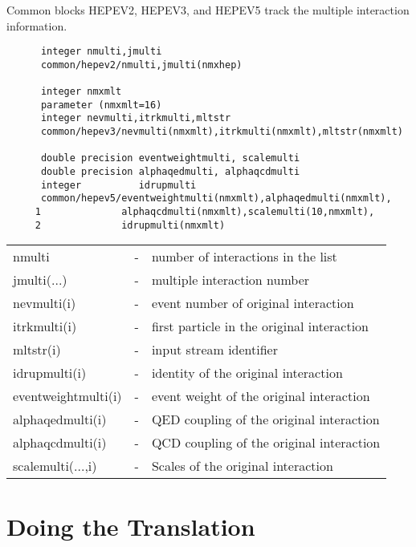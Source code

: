 \noindent Common blocks HEPEV2, HEPEV3, and HEPEV5 track the 
multiple interaction information.
\begin{verbatim}
      integer nmulti,jmulti
      common/hepev2/nmulti,jmulti(nmxhep)

      integer nmxmlt
      parameter (nmxmlt=16)
      integer nevmulti,itrkmulti,mltstr
      common/hepev3/nevmulti(nmxmlt),itrkmulti(nmxmlt),mltstr(nmxmlt)

      double precision eventweightmulti, scalemulti
      double precision alphaqedmulti, alphaqcdmulti
      integer          idrupmulti
      common/hepev5/eventweightmulti(nmxmlt),alphaqedmulti(nmxmlt),
     1              alphaqcdmulti(nmxmlt),scalemulti(10,nmxmlt),
     2              idrupmulti(nmxmlt)
\end{verbatim}
\begin{center}
\begin{tabular}{lcl}
  nmulti              &-& number of interactions in the list\\
  jmulti(...)         &-& multiple interaction number\\
  nevmulti(i)         &-& event number of original interaction\\
  itrkmulti(i)        &-& first particle in the original interaction\\
  mltstr(i)           &-& input stream identifier\\
  idrupmulti(i)       &-& identity of the original interaction\\
  eventweightmulti(i) &-& event weight of the original interaction\\
  alphaqedmulti(i)    &-& QED coupling of the original interaction\\
  alphaqcdmulti(i)    &-& QCD coupling of the original interaction\\
  scalemulti(...,i)   &-& Scales of the original interaction\\
\end{tabular}
\end{center}


\section { Doing the Translation }



